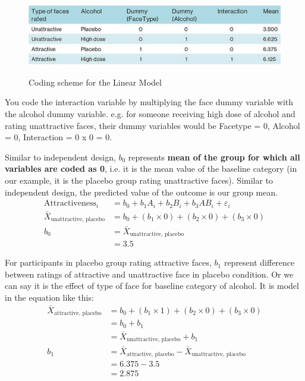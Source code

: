 \begin{figure}[h]
	\includegraphics[width=1\textwidth,height=35mm]{Chapter 14 GLM 3 Factorial Designs/codingscheme.PNG}
	\caption{Coding scheme for the Linear Model}
\end{figure}

You code the interaction variable by multiplying the face dummy variable with the alcohol dummy variable. e.g. for someone receiving high dose of alcohol and rating unattractive faces, their dummy variables would be Facetype = 0, Alcohol = 0, Interaction = 0 x 0 = 0.

Similar to independent design,  $b_0$ represents \textbf{mean of the group for which all variables are coded as 0}, i.e. it is the mean value of the baseline category (in our example, it is the placebo group rating unattractive faces).
Similar to independent design, the predicted value of the outcome is our group mean.
\begin{equation}
\begin{split}
\text{Attractiveness}_i & = b_0 + b_1A_{i} + b_2B_{i} + b_3AB_{i} + \varepsilon_i \\
\bar{X}_{\text{unattractive, placebo}} & = b_0 + (b_1 \times 0) + (b_2 \times 0) + (b_3 \times 0) \\
b_0 & = \bar{X}_{\text{unattractive, placebo}} \\
& = 3.5
\end{split}
\end{equation}

For participants in placebo group rating attractive faces, $b_1$ represent difference between ratings of attractive and unattractive face in placebo condition. Or we can say it is the effect of type of face for baseline category of alcohol. It is model in the equation like this:
\begin{equation}
\begin{split}
\bar{X}_{\text{attractive, placebo}} & = b_0 + (b_1 \times 1) + (b_2 \times 0) + (b_3 \times 0) \\
& = b_0 + b_1 \\
& = \bar{X}_{\text{unattractive, placebo}} + b_1 \\
b_1 & = \bar{X}_{\text{attractive, placebo}} - \bar{X}_{\text{unattractive, placebo}} \\
& = 6.375 - 3.5\\
& = 2.875
\end{split}
\end{equation}
\clearpage

